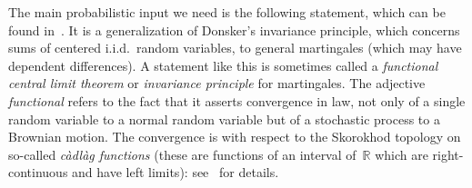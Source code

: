\documentclass[11pt,twoside]{article} %
\numberwithin{equation}{section}
\theoremstyle{definition}
\newcommand*{\R}{\ensuremath{\mathbb{R}}}
\begin{document}
\smallskip

The main probabilistic input we need is the following statement, which can be found in~\cite[Theorem 3.2]{McLeish}. 
It is a generalization of Donsker's invariance principle, which concerns sums of centered i.i.d.~random variables, to general martingales (which may have dependent differences). 
A statement like this is sometimes called a \emph{functional central limit theorem} or \emph{invariance principle} for martingales. 
The adjective \emph{functional} refers to the fact that it asserts convergence in law, not only of a single random variable to a normal random variable but of a stochastic process to a Brownian motion. The convergence is with respect to the Skorokhod topology on so-called \emph{c\`adl\`ag functions} (these are functions of an interval of~$\R$ which are right-continuous and have left limits):  see~\cite[Chapter VI]{JS} for details.  
\end{document}
